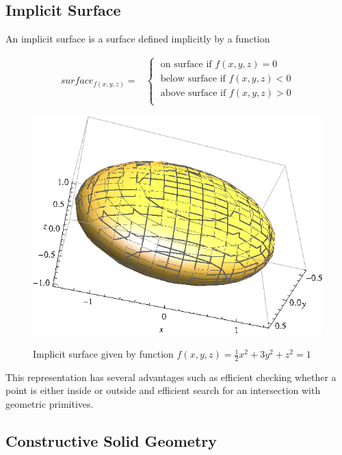 \subsection{Implicit Surface}
An implicit surface\cite{Agin1972} is a surface defined implicitly by a function

\begin{equation}
\begin{split}
surface_{f(x,y,z)} =
  &\left\{\;
    \begin{split}
      \text{on surface if }f(x,y,z) = 0 \\ 
      \text{below surface if }f(x,y,z) < 0 \\
      \text{above surface if }f(x,y,z) > 0 \\
    \end{split}
  \right.
\end{split}
\end{equation}

\begin{figure}[H]
\centering
\includegraphics[scale=1]{../img/implicit_surface.eps}
\label{fig:implicit}
\caption{Implicit surface given by function $f(x,y,z) = \frac{1}{2}x^{2} + 3y^{2} + z^{2} = 1$}
\end{figure}
This representation has several advantages such as efficient checking whether a point is either
inside or outside and efficient search for an intersection with geometric primitives.


\subsection{Constructive Solid Geometry}

